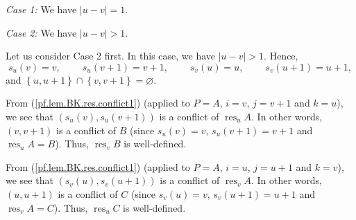 \documentclass[numbers=enddot,12pt,final,onecolumn,notitlepage]{scrartcl}%
\theoremstyle{definition}
\begin{document}
\textit{Case 1:} We have $\left\vert u-v\right\vert =1$.

\textit{Case 2:} We have $\left\vert u-v\right\vert >1$.

Let us consider Case 2 first. In this case, we have $\left\vert u-v\right\vert
>1$. Hence,%
\[
s_{u}\left(  v\right)  =v,\ \ \ \ \ \ \ \ \ \ s_{u}\left(  v+1\right)
=v+1,\ \ \ \ \ \ \ \ \ \ s_{v}\left(  u\right)  =u,\ \ \ \ \ \ \ \ \ \ s_{v}%
\left(  u+1\right)  =u+1,
\]
and $\left\{  u,u+1\right\}  \cap\left\{  v,v+1\right\}  =\varnothing$.

From (\ref{pf.lem.BK.res.conflict1}) (applied to $P=A$, $i=v$, $j=v+1$ and
$k=u$), we see that $\left(  s_{u}\left(  v\right)  ,s_{u}\left(  v+1\right)
\right)  $ is a conflict of $\operatorname*{res}\nolimits_{u}A$. In other
words, $\left(  v,v+1\right)  $ is a conflict of $B$ (since $s_{u}\left(
v\right)  =v$, $s_{u}\left(  v+1\right)  =v+1$ and $\operatorname*{res}%
\nolimits_{u}A=B$). Thus, $\operatorname*{res}\nolimits_{v}B$ is well-defined.

From (\ref{pf.lem.BK.res.conflict1}) (applied to $P=A$, $i=u$, $j=u+1$ and
$k=v$), we see that $\left(  s_{v}\left(  u\right)  ,s_{v}\left(  u+1\right)
\right)  $ is a conflict of $\operatorname*{res}\nolimits_{v}A$. In other
words, $\left(  u,u+1\right)  $ is a conflict of $C$ (since $s_{v}\left(
u\right)  =v$, $s_{v}\left(  u+1\right)  =u+1$ and $\operatorname*{res}%
\nolimits_{v}A=C$). Thus, $\operatorname*{res}\nolimits_{u}C$ is well-defined.
\end{document}
